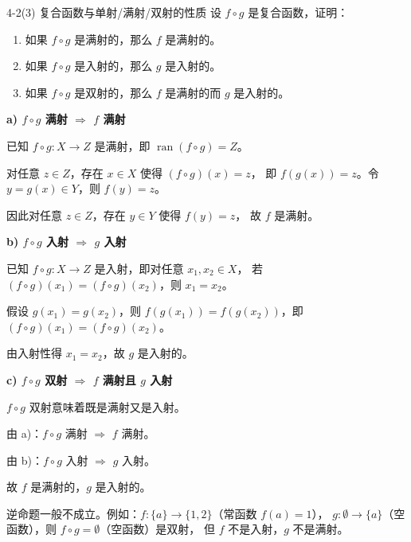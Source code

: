 \documentclass[11pt]{article}
\begin{document}

\begin{question}{4-2(3) 复合函数与单射/满射/双射的性质}
  设 $f \circ g$ 是复合函数，证明：
  \begin{enumerate}
    \item[a)] 如果 $f \circ g$ 是满射的，那么 $f$ 是满射的。
    \item[b)] 如果 $f \circ g$ 是入射的，那么 $g$ 是入射的。
    \item[c)] 如果 $f \circ g$ 是双射的，那么 $f$ 是满射的而 $g$ 是入射的。
  \end{enumerate}

  \begin{answer}
    \vspace{1em}
    \noindent\textbf{a) $f \circ g$ 满射 $\Rightarrow$ $f$ 满射}

    已知 $f \circ g: X \to Z$ 是满射，即 $\operatorname{ran}(f \circ g) = Z$。

    对任意 $z \in Z$，存在 $x \in X$ 使得 $(f \circ g)(x) = z$，
    即 $f(g(x)) = z$。令 $y = g(x) \in Y$，则 $f(y) = z$。

    因此对任意 $z \in Z$，存在 $y \in Y$ 使得 $f(y) = z$，
    故 $f$ 是满射。

    \vspace{1em}
    \noindent\textbf{b) $f \circ g$ 入射 $\Rightarrow$ $g$ 入射}

    已知 $f \circ g: X \to Z$ 是入射，即对任意 $x_1, x_2 \in X$，
    若 $(f \circ g)(x_1) = (f \circ g)(x_2)$，则 $x_1 = x_2$。

    假设 $g(x_1) = g(x_2)$，则
    $f(g(x_1)) = f(g(x_2))$，即 $(f \circ g)(x_1) = (f \circ g)(x_2)$。

    由入射性得 $x_1 = x_2$，故 $g$ 是入射的。

    \vspace{1em}
    \noindent\textbf{c) $f \circ g$ 双射 $\Rightarrow$ $f$ 满射且 $g$ 入射}

    $f \circ g$ 双射意味着既是满射又是入射。

    由 a)：$f \circ g$ 满射 $\Rightarrow$ $f$ 满射。

    由 b)：$f \circ g$ 入射 $\Rightarrow$ $g$ 入射。

    故 $f$ 是满射的，$g$ 是入射的。

    \begin{warn}
      逆命题一般不成立。例如：$f: \{a\} \to \{1,2\}$（常函数 $f(a)=1$），
      $g: \emptyset \to \{a\}$（空函数），则 $f \circ g = \emptyset$（空函数）是双射，
      但 $f$ 不是入射，$g$ 不是满射。
    \end{warn}
  \end{answer}
\end{question}
\end{document}
